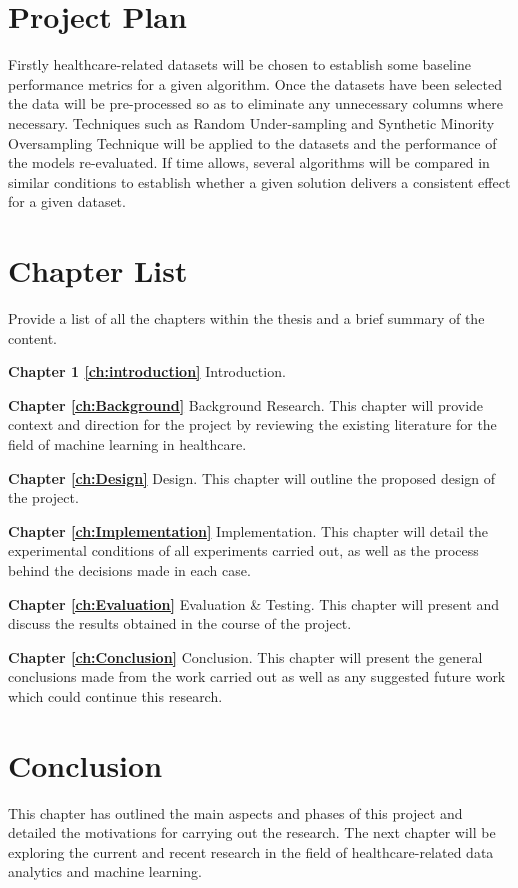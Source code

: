 \section{Project Plan}
Firstly healthcare-related datasets will be chosen to establish some baseline performance metrics for a given algorithm. Once the datasets have been selected the data will be pre-processed so as to eliminate any unnecessary columns where necessary.\newline
Techniques such as Random Under-sampling and Synthetic Minority Oversampling Technique will be applied to the datasets and the performance of the models re-evaluated.\newline
If time allows, several algorithms will be compared in similar conditions to establish whether a given solution delivers a consistent effect for a given dataset.\newline

\section{Chapter List}
Provide a list of all the chapters within the thesis and a brief summary of the content.

\textbf{Chapter 1 \ref{ch:introduction}} Introduction. 

\textbf{Chapter \ref{ch:Background}} Background Research.\newline
This chapter will provide context and direction for the project by reviewing the existing literature for the field of machine learning in healthcare.\newline


\textbf{Chapter \ref{ch:Design}} Design.\newline
This chapter will outline the proposed design of the project.\newline


\textbf{Chapter \ref{ch:Implementation}} Implementation.\newline
This chapter will detail the experimental conditions of all experiments carried out, as well as the process behind the decisions made in each case.\newline

\textbf{Chapter \ref{ch:Evaluation}} Evaluation \& Testing.\newline 
This chapter will present and discuss the results obtained in the course of the project.\newline

\textbf{Chapter \ref{ch:Conclusion}} Conclusion. \newline
This chapter will present the general conclusions made from the work carried out as well as any suggested future work which could continue this research.

\section{Conclusion}
This chapter has outlined the main aspects and phases of this project and detailed the motivations for carrying out the research. 
The next chapter will be exploring the current and recent research in the field of healthcare-related data analytics and machine learning.
